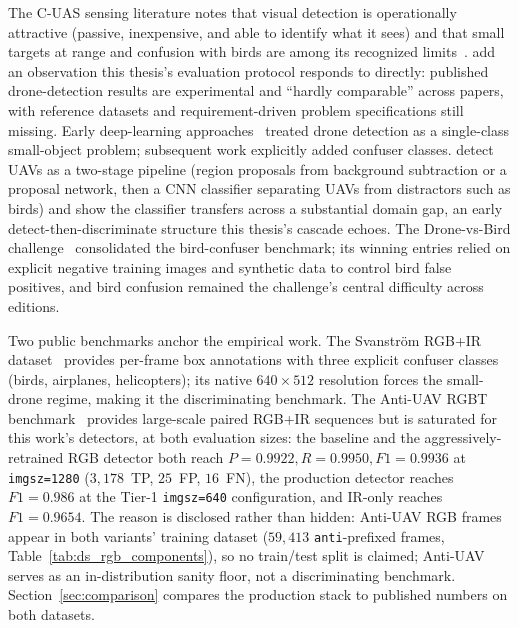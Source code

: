 The C-UAS sensing literature notes that visual detection is operationally attractive (passive, inexpensive, and able to identify what it sees) and that small targets at range and confusion with birds are among its recognized limits~\cite{shi2018counteruas}. \citet{taha2019drone} add an observation this thesis's evaluation protocol responds to directly: published drone-detection results are experimental and ``hardly comparable'' across papers, with reference datasets and requirement-driven problem specifications still missing. Early deep-learning approaches~\cite{aker2017using,rozantsev2017detecting} treated drone detection as a single-class small-object problem; subsequent work explicitly added confuser classes. \citet{schumann2017deep} detect UAVs as a two-stage pipeline (region proposals from background subtraction or a proposal network, then a CNN classifier separating UAVs from distractors such as birds) and show the classifier transfers across a substantial domain gap, an early detect-then-discriminate structure this thesis's cascade echoes. The Drone-vs-Bird challenge~\cite{coluccia2021dronevsbird} consolidated the bird-confuser benchmark; its winning entries relied on explicit negative training images and synthetic data to control bird false positives, and bird confusion remained the challenge's central difficulty across editions.

Two public benchmarks anchor the empirical work. The Svanstr\"om RGB+IR dataset~\cite{svanstrom2021real,svanstrom2022dronedataset} provides per-frame box annotations with three explicit confuser classes (birds, airplanes, helicopters); its native $640\times512$ resolution forces the small-drone regime, making it the discriminating benchmark. The Anti-UAV RGBT benchmark~\cite{jiang2021antiuav,zhao2023antiuav} provides large-scale paired RGB+IR sequences but is saturated for this work's detectors, at both evaluation sizes: the baseline and the aggressively-retrained RGB detector both reach $P=0.9922, R=0.9950, F1=0.9936$ at \texttt{imgsz=1280} ($3{,}178$~TP, $25$~FP, $16$~FN), the production detector reaches $F1=0.986$ at the Tier-1 \texttt{imgsz=640} configuration, and IR-only reaches $F1=0.9654$. The reason is disclosed rather than hidden: Anti-UAV RGB frames appear in both variants' training dataset ($59{,}413$ \texttt{anti}-prefixed frames, Table~\ref{tab:ds_rgb_components}), so no train/test split is claimed; Anti-UAV serves as an in-distribution sanity floor, not a discriminating benchmark. Section~\ref{sec:comparison} compares the production stack to published numbers on both datasets.


